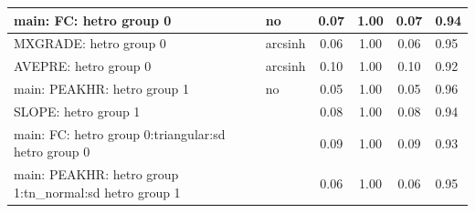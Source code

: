 \begin{table}
\begin{center}
\begin{tabular}{|l|l|c|c|c|l|}
			\hline
			main: FC: hetro group 0 & no & 0.07 & 1.00 & 0.07 & 0.94 \\
			\hline
			MXGRADE: hetro group 0 & arcsinh & 0.06 & 1.00 & 0.06 & 0.95 \\
			\hline
			AVEPRE: hetro group 0 & arcsinh & 0.10 & 1.00 & 0.10 & 0.92 \\
			\hline
			main: PEAKHR: hetro group 1 & no & 0.05 & 1.00 & 0.05 & 0.96 \\
			\hline
			SLOPE: hetro group 1 &  & 0.08 & 1.00 & 0.08 & 0.94 \\
			\hline
			main: FC: hetro group 0:triangular:sd  hetro group 0 &  & 0.09 & 1.00 & 0.09 & 0.93 \\
			\hline
			main: PEAKHR: hetro group 1:tn_normal:sd  hetro group 1 &  & 0.06 & 1.00 & 0.06 & 0.95 \\
			\hline
		\end{tabular}
	\end{center}
\end{table}
